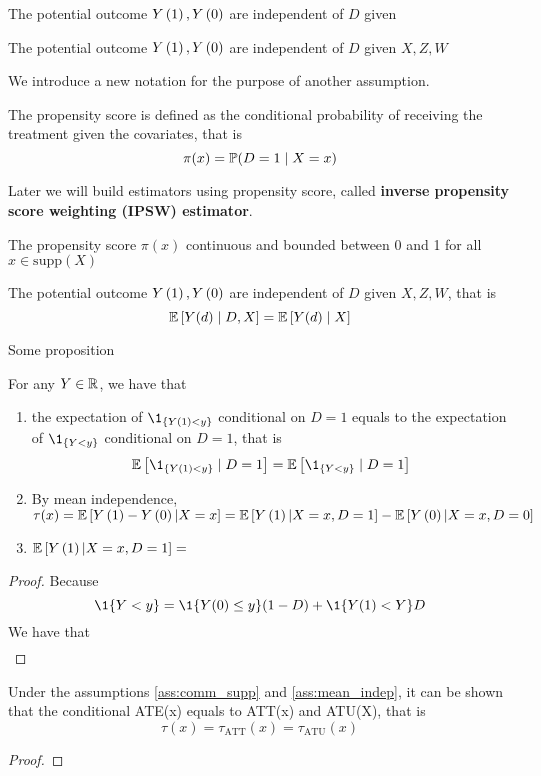 \begin{assumption}
    The potential outcome $Y\left(1\right),Y\left(0\right)$ are independent of $D$ given
\end{assumption}
\begin{assumption}
    The potential outcome $Y\left(1\right),Y\left(0\right)$ are independent of $D$ given $X,Z,W$
\end{assumption}
We introduce a new notation for the purpose of another assumption.
\begin{definition}
    The propensity score is defined as the conditional probability of receiving the treatment given the covariates, that is \[\pi(x)=\mathbb{P}(D=1\mid X=x)\]
\end{definition}
\begin{remark}
    Later we will build estimators using propensity score, called \textbf{inverse propensity score weighting (IPSW) estimator}.
\end{remark}
    \begin{assumption}\label{ass:comm_supp}
    The propensity score $\pi(x)$ continuous and bounded between 0 and 1 for all $x\in \text{supp}(X)$ 
\end{assumption}
\begin{assumption}\label{ass:mean_indep}
    The potential outcome $Y\left(1\right),Y\left(0\right)$ are independent of $D$ given $X,Z,W$, that is \[\mathbb{E}\left[Y(d)\mid D,X\right]=\mathbb{E}\left[Y(d)\mid X\right]\]
\end{assumption}
Some proposition
\begin{proposition}
    For any $Y\in \mathbb{R}$, we have that 
    \begin{enumerate}
        \item the expectation of $\1_{\set{Y(1)<y}}$ conditional on $D=1$ equals to the expectation of $\1_{\set{Y<y}}$ conditional on $D=1$, that is 
    \begin{equation*}
        \E\bra{\1_{\set{Y(1)<y}}\mid D=1} = \E\bra{\1_{\set{Y<y}}\mid D=1}
    \end{equation*}
    \item By mean independence, $\tau(x) = \mathbb{E}\left[Y\left(1\right)-Y\left(0\right)|X=x\right]=\mathbb{E}\left[Y\left(1\right)|X=x,D=1\right]-\mathbb{E}\left[Y\left(0\right)|X=x,D=0\right]$ 
    \item $\mathbb{E}\left[Y\left(1\right)|X=x,D=1\right]=$
    \end{enumerate}
\end{proposition}
\begin{proof}
    Because \[
       \1\{Y<y\}=\1\{Y(0)\le y\}(1-D) +\1\{Y(1)<Y\}D \]
    We have that
    \begin{align*}
    \end{align*}
\end{proof}

\begin{proposition}
    Under the assumptions \ref{ass:comm_supp} and \ref{ass:mean_indep}, it can be shown that the conditional ATE(x) equals to ATT(x) and ATU(X), that is \[\tau(x)=\tau_{\text{ATT}}(x)=\tau_{\text{ATU}}(x)\]
\end{proposition}
\begin{proof}
    
\end{proof}